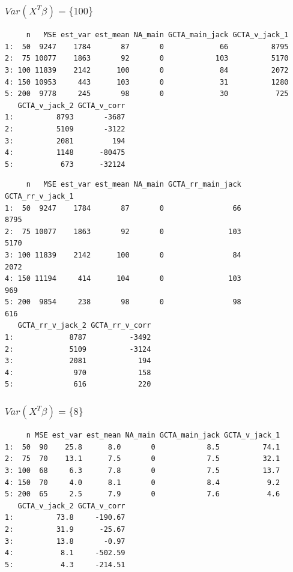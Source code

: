 \documentclass[]{article}
\begin{document}
\subsubsection{\texorpdfstring{\(Var(X^T\beta) = \{100\}\)}{Var(X\^{}T\textbackslash{}beta) = \textbackslash{}\{100\textbackslash{}\}}}\label{varxtbeta-100}

\begin{verbatim}
     n   MSE est_var est_mean NA_main GCTA_main_jack GCTA_v_jack_1
1:  50  9247    1784       87       0             66          8795
2:  75 10077    1863       92       0            103          5170
3: 100 11839    2142      100       0             84          2072
4: 150 10953     443      103       0             31          1280
5: 200  9778     245       98       0             30           725
   GCTA_v_jack_2 GCTA_v_corr
1:          8793       -3687
2:          5109       -3122
3:          2081         194
4:          1148      -80475
5:           673      -32124
\end{verbatim}

\begin{verbatim}
     n   MSE est_var est_mean NA_main GCTA_rr_main_jack GCTA_rr_v_jack_1
1:  50  9247    1784       87       0                66             8795
2:  75 10077    1863       92       0               103             5170
3: 100 11839    2142      100       0                84             2072
4: 150 11194     414      104       0               103              969
5: 200  9854     238       98       0                98              616
   GCTA_rr_v_jack_2 GCTA_rr_v_corr
1:             8787          -3492
2:             5109          -3124
3:             2081            194
4:              970            158
5:              616            220
\end{verbatim}

\subsubsection{\texorpdfstring{\(Var(X^T\beta) = \{8\}\)}{Var(X\^{}T\textbackslash{}beta) = \textbackslash{}\{8\textbackslash{}\}}}\label{varxtbeta-8}

\begin{verbatim}
     n MSE est_var est_mean NA_main GCTA_main_jack GCTA_v_jack_1
1:  50  90    25.8      8.0       0            8.5          74.1
2:  75  70    13.1      7.5       0            7.5          32.1
3: 100  68     6.3      7.8       0            7.5          13.7
4: 150  70     4.0      8.1       0            8.4           9.2
5: 200  65     2.5      7.9       0            7.6           4.6
   GCTA_v_jack_2 GCTA_v_corr
1:          73.8     -190.67
2:          31.9      -25.67
3:          13.8       -0.97
4:           8.1     -502.59
5:           4.3     -214.51
\end{verbatim}
\end{document}

